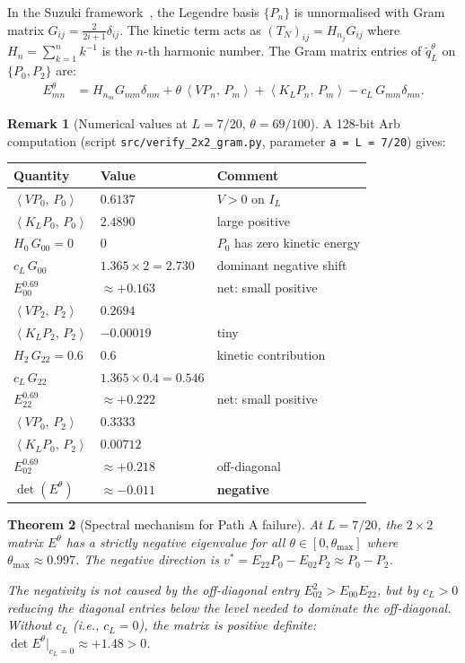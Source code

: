 \documentclass[12pt,a4paper]{amsart}
\theoremstyle{plain}
\newtheorem{theorem}{Theorem}[section]
\theoremstyle{definition}
\newtheorem{remark}[theorem]{Remark}
\newcommand{\IL}{I_L}
\newcommand{\ip}[2]{\left\langle #1,\,#2\right\rangle}
\begin{document}
In the Suzuki framework~\cite{WFP2026}, the Legendre basis $\{P_n\}$ is
unnormalised with Gram matrix $G_{ij} = \tfrac{2}{2i+1}\delta_{ij}$.
The kinetic term acts as $(T_N)_{ij} = H_{n_j}G_{ij}$ where
$H_n = \sum_{k=1}^n k^{-1}$ is the $n$-th harmonic number.
The Gram matrix entries of $\tilde{q}_L^\theta$ on $\{P_0, P_2\}$ are:
\begin{align*}
  E_{mn}^\theta
  &= H_{n_m}G_{mm}\delta_{mn}
     + \theta\,\ip{VP_n}{P_m}
     + \ip{K_LP_n}{P_m}
     - c_L\,G_{mm}\delta_{mn}.
\end{align*}

\begin{remark}[Numerical values at $L=7/20$, $\theta=69/100$]
\label{rem:values}
A 128-bit Arb computation (script \texttt{src/verify\_2x2\_gram.py},
parameter \texttt{a = L = 7/20}) gives:
\begin{center}
\begin{tabular}{lll}
\hline
Quantity & Value & Comment \\
\hline
$\ip{VP_0}{P_0}$ & $0.6137$ & $V > 0$ on $\IL$ \\
$\ip{K_LP_0}{P_0}$ & $2.4890$ & large positive \\
$H_0\,G_{00} = 0$ & $0$ & $P_0$ has zero kinetic energy \\
$c_L\,G_{00}$ & $1.365 \times 2 = 2.730$ & dominant negative shift \\
$E_{00}^{0.69}$ & $\approx +0.163$ & net: small positive \\
\hline
$\ip{VP_2}{P_2}$ & $0.2694$ & \\
$\ip{K_LP_2}{P_2}$ & $-0.00019$ & tiny \\
$H_2\,G_{22} = 0.6$ & $0.6$ & kinetic contribution \\
$c_L\,G_{22}$ & $1.365\times 0.4 = 0.546$ & \\
$E_{22}^{0.69}$ & $\approx +0.222$ & net: small positive \\
\hline
$\ip{VP_0}{P_2}$ & $0.3333$ & \\
$\ip{K_LP_0}{P_2}$ & $0.00712$ & \\
$E_{02}^{0.69}$ & $\approx +0.218$ & off-diagonal \\
\hline
$\det(E^\theta)$ & $\approx -0.011$ & \textbf{negative} \\
\hline
\end{tabular}
\end{center}
\end{remark}

\begin{theorem}[Spectral mechanism for Path A failure]
\label{thm:mechanism}
At $L=7/20$, the $2\times2$ matrix $E^\theta$ has a strictly negative
eigenvalue for all $\theta\in[0, \theta_{\max}]$ where
$\theta_{\max} \approx 0.997$.  The negative direction is
$v^* = E_{22}P_0 - E_{02}P_2 \approx P_0 - P_2$.

The negativity is \emph{not} caused by the off-diagonal entry
$E_{02}^2 > E_{00}E_{22}$, but by $c_L > 0$ reducing the diagonal
entries below the level needed to dominate the off-diagonal.
Without $c_L$ (i.e., $c_L = 0$), the matrix is positive definite:
$\det E^\theta\big|_{c_L=0} \approx +1.48 > 0$.
\end{theorem}
\end{document}
